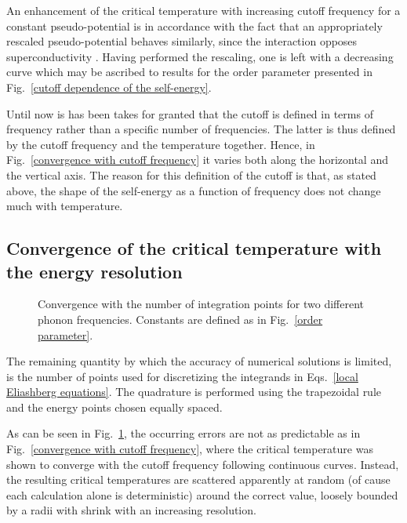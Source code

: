 An enhancement of the critical temperature with increasing cutoff frequency for
a constant  pseudo-potential is in accordance with the fact that
an appropriately rescaled  pseudo-potential behaves similarly,
since the  interaction opposes superconductivity
\cite[1038]{Carbotte90}. Having performed the rescaling, one is left with a
decreasing curve which may be ascribed to results for the order parameter
presented in Fig.~\ref{cutoff dependence of the self-energy}.

Until now is has been takes for granted that the cutoff is defined in terms of
frequency rather than a specific number of  frequencies. The
latter is thus defined by the cutoff frequency and the temperature together.
Hence, in Fig.~\ref{convergence with cutoff frequency} it varies both along the
horizontal and the vertical axis. The reason for this definition of the cutoff
is that, as stated above, the shape of the self-energy as a function of
frequency does not change much with temperature.

\subsection{Convergence of the critical temperature with the energy resolution}

\begin{figure}
    \small
    \centering
    
    \caption[Convergence with number of integration points]{
        Convergence with the number of integration points for two different
        phonon frequencies. Constants are defined as in Fig.~\ref{order
        parameter}.}
    \label{convergence with energy resolution}
\end{figure}
%
The remaining quantity by which the accuracy of numerical solutions is limited,
is the number of points used for discretizing the integrands in Eqs.~\ref{local
Eliashberg equations}. The quadrature is performed using the trapezoidal rule
and the energy points chosen equally spaced.

As can be seen in Fig.~\ref{convergence with energy resolution}, the occurring
errors are not as predictable as in Fig.~\ref{convergence with cutoff
frequency}, where the critical temperature was shown to converge with the cutoff
frequency following continuous curves. Instead, the resulting critical
temperatures are scattered apparently at random (of cause each calculation alone
is deterministic) around the correct value, loosely bounded by a radii with
shrink with an increasing resolution.

